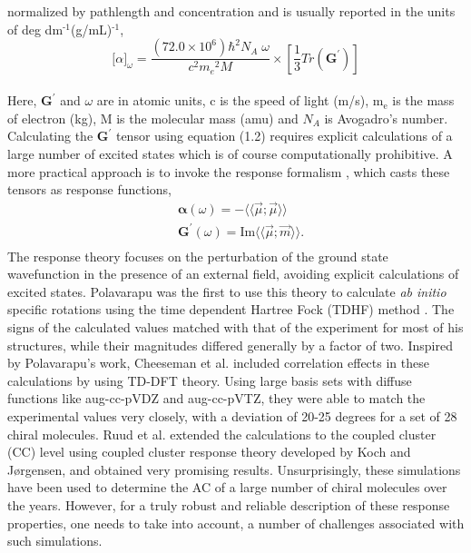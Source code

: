 normalized by pathlength and concentration and is usually reported in the units of deg dm$^{\text{-1}}$(g/mL)$^{\text{-1}}$,\cite{Crawford06}
\\
\begin{equation}
{\lbrack\alpha\rbrack}_{\omega} = \frac{(72.0 \times 10^6){\hbar}^2 N_A\;\omega}{c^2{m_e}^2 M} \times \left[ \frac{1}{3}Tr(\textbf{G}^\prime)\right]
\end{equation}
\\
Here, $\textbf{G}^\prime$ and $\omega$ are in atomic units, c is the speed of light (m/s), m$_{\text{e}}$ is the 
mass of electron (kg), M is the molecular mass (amu) and $N_A$ is Avogadro's number. Calculating the 
$\textbf{G}^\prime$ tensor using equation (1.2) requires explicit calculations of a large number of 
excited states which is of course computationally prohibitive. A more practical approach is to invoke the response formalism
\cite{Kobayashi94,Koch90}, which casts these tensors as response functions,
\begin{equation}
\begin{split}
&\bm{\alpha}(\omega) = -\langle\langle\vec{\mu};\vec{\mu}\rangle\rangle\\
&\textbf{G}^{\prime}(\omega) = \text{Im}\langle\langle\vec{\mu};\vec{m}\rangle\rangle.\\
\end{split}
\end{equation} 
The response theory focuses on the perturbation of the ground state wavefunction in the presence of an external 
field, avoiding explicit calculations of excited states. Polavarapu was the first to use this theory to calculate 
{\em ab initio} specific rotations using the time dependent Hartree Fock (TDHF) method \cite{Polavarapu96}. 
The signs of the calculated values matched with that of the experiment for most of his structures, while their magnitudes 
differed generally by a factor of two. Inspired by Polavarapu's work, Cheeseman et al. \cite{Cheeseman00,Stephens01} 
included correlation effects in these calculations by using TD-DFT theory. Using large basis sets with diffuse functions like 
aug-cc-pVDZ and aug-cc-pVTZ,\cite{Dunning89,Kendall92,Woon94} they were able to match the experimental values very closely, with a 
deviation of 20-25 degrees for a set of 28 chiral molecules. Ruud et al. extended the calculations to the coupled cluster (CC)
level using coupled cluster response theory developed by Koch and J{\o}rgensen\cite{Koch90}, and obtained very 
promising results\cite{Ruud03}. Unsurprisingly, these simulations have been used to determine the AC of a large number of 
chiral molecules over the years\cite{Kondru99}. However, for a truly robust and reliable description of these response 
properties, one needs to take into account, a number of challenges associated with such simulations.
